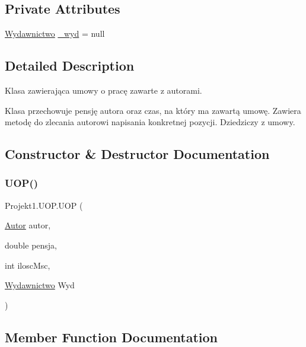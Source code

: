 \subsection*{Private Attributes}
\begin{DoxyCompactItemize}
\item 
\mbox{\hyperlink{class_projekt1_1_1_wydawnictwo}{Wydawnictwo}} \mbox{\hyperlink{class_projekt1_1_1_u_o_p_aba15bdd02a03a7cabe932f4131b996c2}{\+\_\+wyd}} = null
\end{DoxyCompactItemize}


\subsection{Detailed Description}
Klasa zawierająca umowy o pracę zawarte z autorami. 

Klasa przechowuje pensję autora oraz czas, na który ma zawartą umowę. Zawiera metodę do zlecania autorowi napisania konkretnej pozycji. Dziedziczy z umowy. 

\subsection{Constructor \& Destructor Documentation}
\mbox{\label{class_projekt1_1_1_u_o_p_ac14809e97da3e9cede220d7a4081f7e6}} 
\subsubsection{\texorpdfstring{UOP()}{UOP()}}
{\footnotesize\ttfamily Projekt1.\+U\+O\+P.\+U\+OP (\begin{DoxyParamCaption}\item[{\mbox{\hyperlink{class_projekt1_1_1_autor}{Autor}}}]{autor,  }\item[{double}]{pensja,  }\item[{int}]{ilosc\+Msc,  }\item[{\mbox{\hyperlink{class_projekt1_1_1_wydawnictwo}{Wydawnictwo}}}]{Wyd }\end{DoxyParamCaption})}



\subsection{Member Function Documentation}
\mbox{\label{class_projekt1_1_1_u_o_p_a50249c67a2308a1b43a14aadf795a9c8}} 
